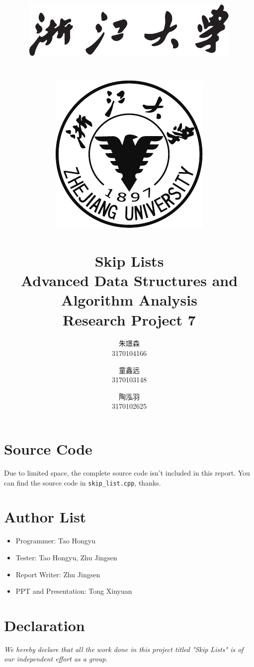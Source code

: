 \documentclass[12pt,a4paper,titlepage]{article}
\title{
	\includegraphics[scale=1.5]{zju_1.pdf}\\~\\
	\includegraphics[scale=1]{zju_2.pdf}\\
	~\\
	\Huge{Skip Lists}\\[2ex]
	\sffamily\large{Advanced Data Structures and Algorithm Analysis\\Research Project 7}
}
\author{
	\sffamily
	朱璟森\\
	3170104166
\and
	\sffamily
	童鑫远\\
	3170103148
\and
	\sffamily
	陶泓羽\\
	3170102625
}
\begin{document}
	\maketitle
	\tableofcontents
	\newpage

	
	
	
	

	\newpage

	\begin{appendices}
		\section*{Source Code}
		Due to limited space, the complete source code isn't included in this report. You can find the source code in \texttt{skip\_list.cpp}, thanks.
		\section*{Author List}
		\begin{itemize}
			\item Programmer: Tao Hongyu
			\item Tester: Tao Hongyu, Zhu Jingsen
			\item Report Writer: Zhu Jingsen
			\item PPT and Presentation: Tong Xinyuan
		\end{itemize}
		\section*{Declaration}
		\textit{We hereby declare that all the work done in this project titled "Skip Lists" is of our independent effort as a group.}
	\end{appendices}

%	
\end{document}
